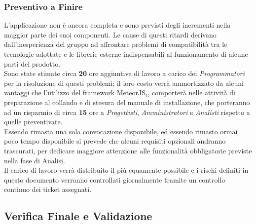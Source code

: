 \subsubsection{Preventivo a Finire}
L'applicazione non è ancora completa e sono previsti degli incrementi nella maggior parte dei suoi componenti. Le cause di questi ritardi derivano dall'inesperienza del gruppo ad affrontare problemi di compatibilità tra le tecnologie adottate e le librerie esterne indispensabili al funzionamento di alcune parti del prodotto. \\
Sono state stimate circa \textbf{20} ore aggiuntive di lavoro a carico dei \textit{Programmatori} per la risoluzione di questi problemi; il loro costo verrà ammortizzato da alcuni vantaggi che l'utilizzo del framework MeteorJS$_G$ comporterà nelle attività di preparazione al collaudo e di stesura del manuale di installazione, che porteranno ad un risparmio di circa \textbf{15} ore a \textit{Progettisti}, \textit{Amministratori} e \textit{Analisti} rispetto a quelle preventivate. \\
Essendo rimasta una sola convocazione disponibile, ed essendo rimasto ormai poco tempo disponibile si prevede che alcuni requisiti opzionali andranno trascurati, per dedicare maggiore attenzione alle funzionalità obbligatorie previste nella fase di Analisi. \\
Il carico di lavoro verrà distribuito il più equamente possibile e i rischi definiti in questo documento verranno controllati giornalmente tramite un controllo continuo dei ticket assegnati.








\clearpage
\subsection{Verifica Finale e Validazione}

